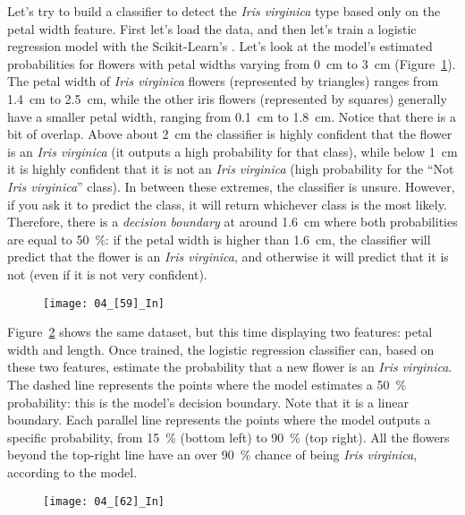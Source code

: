 Let's try to build a classifier to detect the \emph{Iris virginica} type based only on the petal width feature. First let's load the data, and then let's train a logistic regression model with the Scikit-Learn's . Let's look at the model's estimated probabilities for flowers with petal widths varying from \SI{0}{\centi\meter} to \SI{3}{\centi\meter} (Figure~\ref{04_[59]_In}). The petal width of \emph{Iris virginica} flowers (represented by triangles) ranges from \SI{1.4}{\centi\meter} to \SI{2.5}{\centi\meter}, while the other iris flowers (represented by squares) generally have a smaller petal width, ranging from \SI{0.1}{\centi\meter} to \SI{1.8}{\centi\meter}. Notice that there is a bit of overlap. Above about \SI{2}{\centi\meter} the classifier is highly confident that the flower is an \emph{Iris virginica} (it outputs a high probability for that class), while below \SI{1}{\centi\meter} it is highly confident that it is not an \emph{Iris virginica} (high probability for the ``Not \emph{Iris virginica}'' class). In between these extremes, the classifier is unsure. However, if you ask it to predict the class, it will return whichever class is the most likely. Therefore, there is a \emph{decision boundary} at around \SI{1.6}{\centi\meter} where both probabilities are equal to \SI{50}{\percent}: if the petal width is higher than \SI{1.6}{\centi\meter}, the classifier will predict that the flower is an \emph{Iris virginica}, and otherwise it will predict that it is not (even if it is not very confident).
\begin{figure}[h!t]
\centering
\texttt{[image: 04\_[59]\_In]}
\caption{}\label{04_[59]_In}
\end{figure}

Figure~\ref{04_[62]_In} shows the same dataset, but this time displaying two features: petal width and length. Once trained, the logistic regression classifier can, based on these two features, estimate the probability that a new flower is an \emph{Iris virginica}. The dashed line represents the points where the model estimates a \SI{50}{\percent} probability: this is the model's decision boundary. Note that it is a linear boundary. Each parallel line represents the points where the model outputs a specific probability, from \SI{15}{\percent} (bottom left) to \SI{90}{\percent} (top right). All the flowers beyond the top-right line have an over \SI{90}{\percent} chance of
being \emph{Iris virginica}, according to the model.
\begin{figure}[h!t]
\centering
\texttt{[image: 04\_[62]\_In]}
\caption{}\label{04_[62]_In}
\end{figure}
